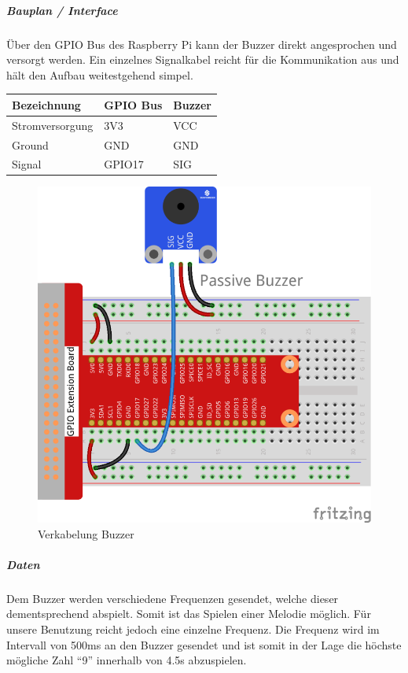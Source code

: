 \documentclass[../../main.tex]{subfiles}
\begin{document}
\subparagraph{Bauplan / Interface}

Über den GPIO Bus des Raspberry Pi kann der Buzzer direkt angesprochen und versorgt werden. Ein einzelnes Signalkabel reicht für die Kommunikation aus und hält den Aufbau weitestgehend simpel.

\begin{table}[H]
\begin{flushleft}
\begin{tabular}{lll}
\hline
Bezeichnung     & GPIO Bus & Buzzer \\ \hline
Stromversorgung & 3V3      & VCC    \\ \hline
Ground          & GND      & GND    \\ \hline
Signal          & GPIO17   & SIG    \\ \hline
\end{tabular}
\end{flushleft}
\end{table}

\begin{figure}[H] \centering
  \includegraphics{VerkabelungAkustik}
  \caption{Verkabelung Buzzer}
  \label{fig:Buzzer}
\end{figure}

\subparagraph{Daten}
Dem Buzzer werden verschiedene Frequenzen gesendet, welche dieser dementsprechend abspielt. Somit ist das Spielen einer Melodie möglich. Für unsere Benutzung reicht jedoch eine einzelne Frequenz. Die Frequenz wird im Intervall von 500ms an den Buzzer gesendet und ist somit in der Lage die höchste mögliche Zahl ``9'' innerhalb von 4.5s abzuspielen.
\end{document}
